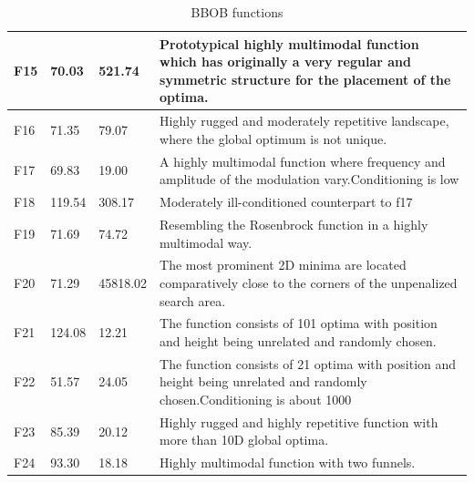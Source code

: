 \documentclass{article}
\begin{document}
\begin{table}[H]
{\begin{tabular}{|l|l|l|l|}
        F15 & 70.03 & 521.74 & Prototypical highly multimodal function which has originally a very regular and symmetric structure for the placement of the optima. \\ \hline
        F16 & 71.35 & 79.07 & Highly rugged and moderately repetitive landscape, where the global optimum is not unique. \\ \hline
        F17 & 69.83 & 19.00  & A highly multimodal function where frequency and amplitude of the modulation vary.Conditioning is low \\ \hline
        F18 & 119.54 & 308.17 & Moderately ill-conditioned counterpart to f17 \\ \hline
        F19 & 71.69 & 74.72 & Resembling the Rosenbrock function in a highly multimodal way. \\ \hline
        F20 & 71.29 & 45818.02 & The most prominent 2D minima are located comparatively close to the corners of the unpenalized search area. \\ \hline
        F21 & 124.08 & 12.21 & The function consists of 101 optima with position and height being unrelated and randomly chosen. \\ \hline
        F22 & 51.57 & 24.05 & The function consists of 21 optima with position and height being unrelated and randomly chosen.Conditioning is about 1000 \\ \hline
        F23 & 85.39 & 20.12 & Highly rugged and highly repetitive function with more than 10D global optima. \\ \hline
        F24 & 93.30  & 18.18 &  Highly multimodal function with two funnels. \\ \hline
    \end{tabular}
    }
    \caption{BBOB functions}
\end{table}
\end{document}
